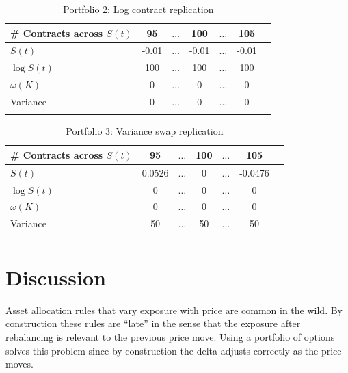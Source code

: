\documentclass[12pt]{article}
\begin{document}
   
    \begin{table}[!ht]
     \caption{Portfolio 2: Log contract replication}\label{tab:port2}
     \centering
     \begin{tabularx}{\linewidth}{Xcccccc}\toprule
         \# Contracts across $S(t)$& 95  & $\ldots$ & 100 & $\ldots$ & 105\\ \midrule
       
       $S(t)$ & -0.01 & $\ldots$ & -0.01& $\ldots$ &  -0.01   \\
       $\log S(t)$& 100 & $\ldots$ & 100 & $\ldots$ &  100   \\
       $\omega(K)$ & 0 & $\ldots$ & 0 & $\ldots$ &  0   \\
       Variance &  0 & $\ldots$ & 0& $\ldots$ &  0   \\
       \addlinespace
     \end{tabularx}

   \end{table}
   
   
    \begin{table}[!ht]
     \caption{Portfolio 3: Variance swap replication}\label{tab:port3}
     \centering
     \begin{tabularx}{\linewidth}{Xcccccc}\toprule
        \# Contracts across $S(t)$ & 95  & $\ldots$ & 100 & $\ldots$ & 105\\ \midrule
       
       $S(t)$ & 0.0526 & $\ldots$ & 0& $\ldots$ &  -0.0476\\ 
       $\log S(t)$& 0 & $\ldots$ & 0& $\ldots$ &  0   \\
       $\omega(K)$ & 0 & $\ldots$ & 0 & $\ldots$ &  0   \\
       Variance &  50 & $\ldots$ & 50& $\ldots$ &  50   \\
       \addlinespace
     \end{tabularx}

   \end{table}

\section{Discussion}

Asset allocation rules that vary exposure with price are common in the wild. By construction these rules are ``late'' in the sense that the exposure after rebalancing is relevant to the previous price move. Using a portfolio of options solves this problem since by construction the delta adjusts correctly as the price moves. 
\end{document}
